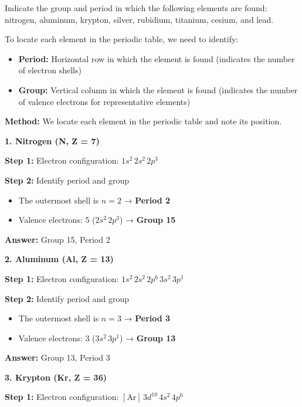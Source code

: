 \begin{exercise}
    Indicate the group and period in which the following elements are found: nitrogen, aluminum, krypton, silver, rubidium, titanium, cesium, and lead.
    \begin{solu}
        To locate each element in the periodic table, we need to identify:
        \begin{itemize}
            \item \textbf{Period:} Horizontal row in which the element is found (indicates the number of electron shells)
            \item \textbf{Group:} Vertical column in which the element is found (indicates the number of valence electrons for representative elements)
        \end{itemize}

        \textbf{Method:} We locate each element in the periodic table and note its position.

        \textbf{1. Nitrogen (N, Z = 7)}

        \textbf{Step 1:} Electron configuration: \(1s^2 \, 2s^2 \, 2p^3\)

        \textbf{Step 2:} Identify period and group
        \begin{itemize}
            \item The outermost shell is \(n = 2\) → \textbf{Period 2}
            \item Valence electrons: 5 (\(2s^2 \, 2p^3\)) → \textbf{Group 15}
        \end{itemize}

        \textbf{Answer:} Group 15, Period 2

        \textbf{2. Aluminum (Al, Z = 13)}

        \textbf{Step 1:} Electron configuration: \(1s^2 \, 2s^2 \, 2p^6 \, 3s^2 \, 3p^1\)

        \textbf{Step 2:} Identify period and group
        \begin{itemize}
            \item The outermost shell is \(n = 3\) → \textbf{Period 3}
            \item Valence electrons: 3 (\(3s^2 \, 3p^1\)) → \textbf{Group 13}
        \end{itemize}

        \textbf{Answer:} Group 13, Period 3

        \textbf{3. Krypton (Kr, Z = 36)}

        \textbf{Step 1:} Electron configuration: \([\text{Ar}] \, 3d^{10} \, 4s^2 \, 4p^6\)


\end{solu}
\end{exercise}
